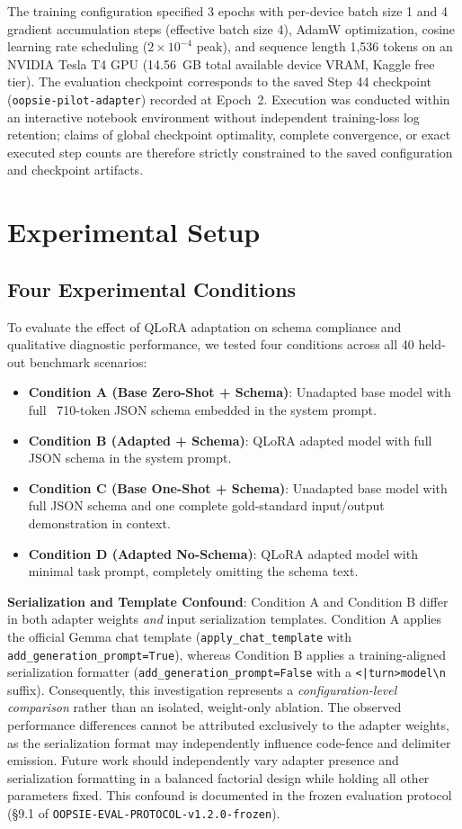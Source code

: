 \documentclass[11pt,a4paper]{article}
\begin{document}
The training configuration specified 3 epochs with per-device batch size 1 and 4 gradient accumulation steps (effective batch size 4), AdamW optimization, cosine learning rate scheduling ($2 \times 10^{-4}$ peak), and sequence length 1,536 tokens on an NVIDIA Tesla T4 GPU (14.56~GB total available device VRAM, Kaggle free tier). The evaluation checkpoint corresponds to the saved Step 44 checkpoint (\texttt{oopsie-pilot-adapter}) recorded at Epoch~2. Execution was conducted within an interactive notebook environment without independent training-loss log retention; claims of global checkpoint optimality, complete convergence, or exact executed step counts are therefore strictly constrained to the saved configuration and checkpoint artifacts.

\section{Experimental Setup}

\subsection{Four Experimental Conditions}
\label{sec:four-conditions}
To evaluate the effect of QLoRA adaptation on schema compliance and qualitative diagnostic performance, we tested four conditions across all 40 held-out benchmark scenarios:
\begin{itemize}
    \item \textbf{Condition A (Base Zero-Shot + Schema)}: Unadapted base model with full ~710-token JSON schema embedded in the system prompt.
    \item \textbf{Condition B (Adapted + Schema)}: QLoRA adapted model with full JSON schema in the system prompt.
    \item \textbf{Condition C (Base One-Shot + Schema)}: Unadapted base model with full JSON schema and one complete gold-standard input/output demonstration in context.
    \item \textbf{Condition D (Adapted No-Schema)}: QLoRA adapted model with minimal task prompt, completely omitting the schema text.
\end{itemize}

\textbf{Serialization and Template Confound}: Condition A and Condition B differ in both adapter weights \emph{and} input serialization templates. Condition A applies the official Gemma chat template (\texttt{apply\_chat\_template} with \texttt{add\_generation\_prompt=True}), whereas Condition B applies a training-aligned serialization formatter (\texttt{add\_generation\_prompt=False} with a \texttt{<|turn>model\textbackslash{}n} suffix). Consequently, this investigation represents a \emph{configuration-level comparison} rather than an isolated, weight-only ablation. The observed performance differences cannot be attributed exclusively to the adapter weights, as the serialization format may independently influence code-fence and delimiter emission. Future work should independently vary adapter presence and serialization formatting in a balanced factorial design while holding all other parameters fixed. This confound is documented in the frozen evaluation protocol (\S9.1 of \texttt{OOPSIE-EVAL-PROTOCOL-v1.2.0-frozen}).
\end{document}
